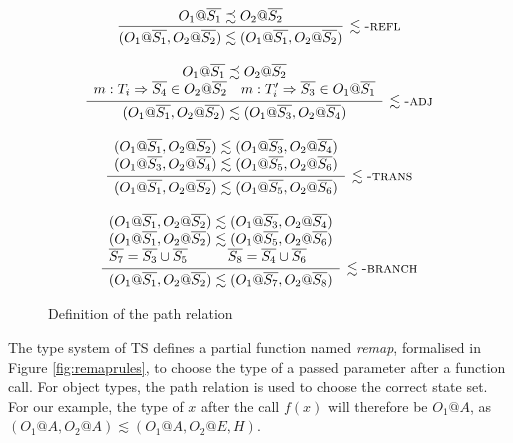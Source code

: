 \documentclass[preprint]{sigplanconf}
\makeatletter
\newcommand{\figref}[1]{Figure \ref{#1}}
\newcommand{\ot}[2]{#1@\overline{#2}}
\makeatother
\begin{document}
\begin{figure}

\[
\begin{array}{c}

\infer[\lesssim\textsc{-refl}]
  {(O_1@\overline{S_1}, O_2@\overline{S_2}) \lesssim (O_1@\overline{S_1}, O_2@\overline{S_2})}
  {O_1@\overline{S_1} \precsim O_2@\overline{S_2}}
\\\\
\infer[\lesssim\textsc{-adj}]
  {(O_1@\overline{S_1}, O_2@\overline{S_2}) \lesssim (O_1@\overline{S_3}, O_2@\overline{S_4})}
  {
    \begin{array}{cc}
    \multicolumn{2}{c}{O_1@\overline{S_1} \precsim O_2@\overline{S_2}}
    \\
    m : T_i \Rightarrow \overline{S_4} \in O_2@\overline{S_2}
    &
    m : T_i' \Rightarrow \overline{S_3} \in O_1@\overline{S_1}
    \end{array}
  }

\\\\
\infer[\lesssim\textsc{-trans}]
  {
  (O_1@\overline{S_1}, O_2@\overline{S_2}) \lesssim (O_1@\overline{S_5}, O_2@\overline{S_6})
  }
  {
  \begin{array}{c}
  (O_1@\overline{S_1}, O_2@\overline{S_2}) \lesssim (O_1@\overline{S_3}, O_2@\overline{S_4})
  \\
  (O_1@\overline{S_3}, O_2@\overline{S_4}) \lesssim (O_1@\overline{S_5}, O_2@\overline{S_6})
  \end{array}
  }
\\\\
\infer[\lesssim\textsc{-branch}]
	{
	(\ot{O_1}{S_1}, \ot{O_2}{S_2}) \lesssim (\ot{O_1}{S_7}, \ot{O_2}{S_8})
	}
	{
	\begin{array}{cc}
	\multicolumn{2}{c}{
	(\ot{O_1}{S_1}, \ot{O_2}{S_2}) \lesssim (\ot{O_1}{S_3}, \ot{O_2}{S_4})
	}
	\\
	\multicolumn{2}{c}{
	(\ot{O_1}{S_1}, \ot{O_2}{S_2}) \lesssim (\ot{O_1}{S_5}, \ot{O_2}{S_6})
	}
	\\
	\overline{S_7} = \overline{S_3} \cup \overline{S_5}
	&
	\overline{S_8} = \overline{S_4} \cup \overline{S_6}
	\end{array}
	}
	
\end{array}
\]
\caption{\label{fig:simreach} Definition of the path relation}
\end{figure}

The type system of TS defines a partial function named {\it remap}, 
formalised in \figref{fig:remaprules}, to choose the type of a passed parameter
after a function call. For object types, the path relation is used to choose
the correct state set. For our example, the type of $x$ after the call
$f(x)$ will therefore be $O_1@A$, as
$(O_1@A, O_2@A) \lesssim (O_1@A, O_2@{E,H})$.
\end{document}
